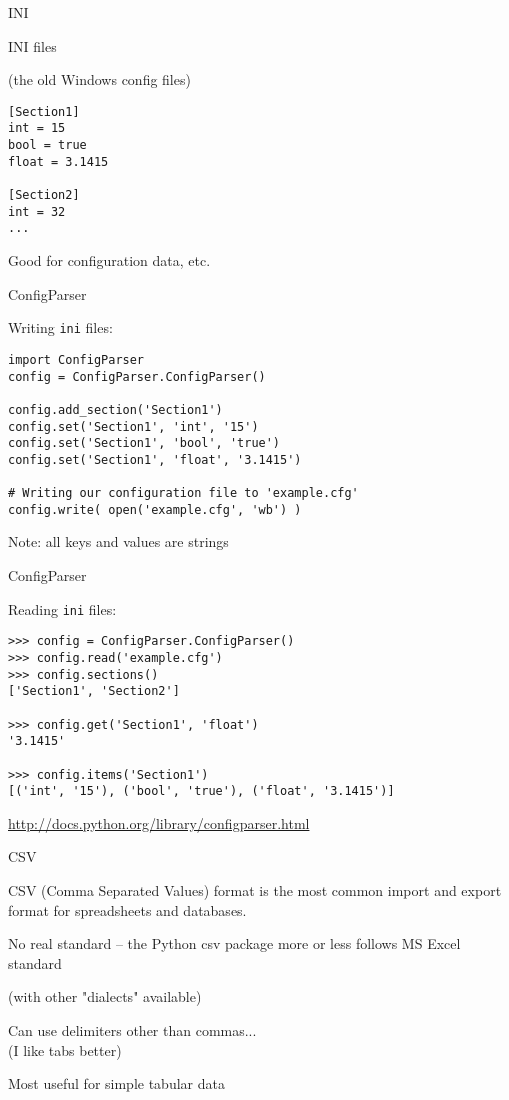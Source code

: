 \documentclass{beamer}
\begin{document}
\begin{frame}[fragile]{INI}

{\Large INI files}

(the old Windows config files)

\begin{verbatim}
[Section1]
int = 15
bool = true
float = 3.1415

[Section2]
int = 32
...
\end{verbatim}
\vfill
{\Large Good for configuration data, etc.}
\end{frame}

\begin{frame}[fragile]{ConfigParser}

{\Large Writing \verb|ini| files:}

\begin{verbatim}
import ConfigParser
config = ConfigParser.ConfigParser()

config.add_section('Section1')
config.set('Section1', 'int', '15')
config.set('Section1', 'bool', 'true')
config.set('Section1', 'float', '3.1415')

# Writing our configuration file to 'example.cfg'
config.write( open('example.cfg', 'wb') )
\end{verbatim}

\vfill
Note: all keys and values are strings
\end{frame}

\begin{frame}[fragile]{ConfigParser}

{\Large Reading \verb|ini| files:}

\begin{verbatim}
>>> config = ConfigParser.ConfigParser()
>>> config.read('example.cfg')
>>> config.sections()
['Section1', 'Section2']

>>> config.get('Section1', 'float')
'3.1415'

>>> config.items('Section1')
[('int', '15'), ('bool', 'true'), ('float', '3.1415')]
\end{verbatim}

\vfill
\url{http://docs.python.org/library/configparser.html}
\end{frame}

\begin{frame}[fragile]{CSV}

{\Large CSV (Comma Separated Values) format is the
most common import and export format for spreadsheets and databases.}

\vfill
{\Large No real standard -- the Python csv package more or less follows MS Excel standard}

(with other "dialects" available)

\vfill
{\Large Can use delimiters other than commas...}\\
(I like tabs better)

\vfill
{\Large Most useful for simple tabular data}

\end{frame}
\end{document}
